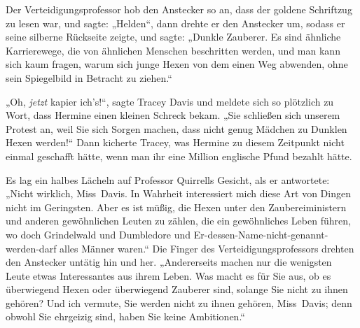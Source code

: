 Der Verteidigungsprofessor hob den Anstecker so an, dass der goldene Schriftzug \SPHEW zu lesen war, und sagte:
„Helden“, dann drehte er den Anstecker um, sodass er seine silberne Rückseite zeigte, und sagte:
„Dunkle Zauberer. Es sind ähnliche Karrierewege, die von ähnlichen Menschen beschritten werden, und man kann sich kaum fragen, warum sich junge Hexen von dem einen Weg abwenden, ohne sein Spiegelbild in Betracht zu ziehen.“

„Oh, \emph{jetzt} kapier ich’s!“, sagte Tracey Davis und meldete sich so plötzlich zu Wort, dass Hermine einen kleinen Schreck bekam.
„Sie schließen sich unserem Protest an, weil Sie sich Sorgen machen, dass nicht genug Mädchen zu Dunklen Hexen werden!“ Dann kicherte Tracey, was Hermine zu diesem Zeitpunkt nicht einmal geschafft hätte, wenn man ihr eine Million englische Pfund bezahlt hätte.

Es lag ein halbes Lächeln auf Professor Quirrells Gesicht, als er antwortete:
„Nicht wirklich, Miss~Davis. In Wahrheit interessiert mich diese Art von Dingen nicht im Geringsten. Aber es ist müßig, die Hexen unter den Zaubereiministern und anderen gewöhnlichen Leuten zu zählen, die ein gewöhnliches Leben führen, wo doch Grindelwald und Dumbledore und Er-dessen-Name-nicht-genannt-werden-darf alles Männer waren.“ Die Finger des Verteidigungsprofessors drehten den Anstecker untätig hin und her.
„Andererseits machen nur die wenigsten Leute etwas Interessantes aus ihrem Leben. Was macht es für Sie aus, ob es überwiegend Hexen oder überwiegend Zauberer sind, solange Sie nicht zu ihnen gehören? Und ich vermute, Sie werden nicht zu ihnen gehören, Miss~Davis; denn obwohl Sie ehrgeizig sind, haben Sie keine Ambitionen.“

